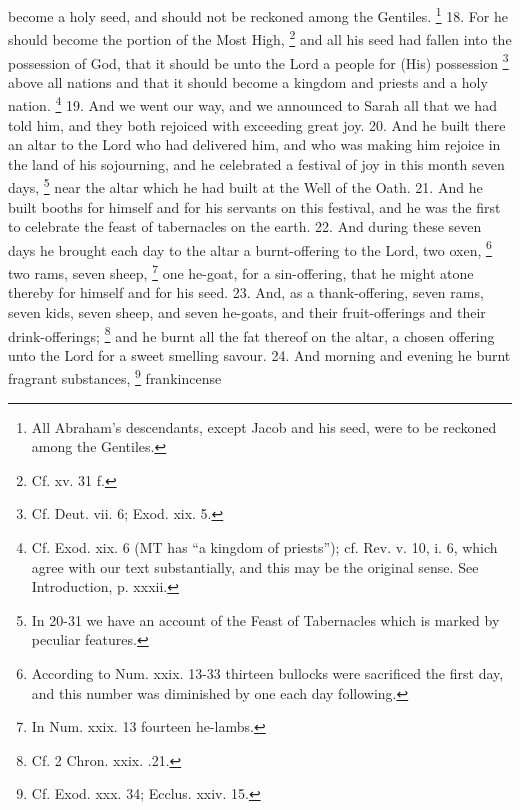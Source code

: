 become a holy seed, and should not be reckoned among the Gentiles. \footnote{All Abraham's descendants, except Jacob and his seed, were to be reckoned among the Gentiles.} 18. For he should become the portion of the Most High, \footnote{Cf. xv. 31 f.} and all his seed had fallen into the possession of God, that it should be unto the Lord a people for (His) possession \footnote{Cf. Deut. vii. 6; Exod. xix. 5.} above all nations and that it should become a kingdom and priests and a holy nation. \footnote{Cf. Exod. xix. 6 (MT has ``a kingdom of priests''); cf. Rev. v. 10, i. 6, which agree with our text substantially, and this may be the original sense. See Introduction, p. xxxii.} 19. And we went our way, and we announced to Sarah all that we had told him, and they both rejoiced with exceeding great joy. 20. And he built there an altar to the Lord who had delivered him, and who was making him rejoice in the land of his sojourning, and he celebrated a festival of joy in this month seven days, \footnote{In 20-31 we have an account of the Feast of Tabernacles which is marked by peculiar features.} near the altar which he had built at the Well of the Oath. 21. And he built booths for himself and for his servants on this festival, and he was the first to celebrate the feast of tabernacles on the earth. 22. And during these seven days he brought each day to the altar a burnt-offering to the Lord, two oxen, \footnote{According to Num. xxix. 13-33 thirteen bullocks were sacrificed the first day, and this number was diminished by one each day following.} two rams, seven sheep, \footnote{In Num. xxix. 13 fourteen he-lambs.} one he-goat, for a sin-offering, that he might atone thereby for himself and for his seed. 23. And, as a thank-offering, seven rams, seven kids, seven sheep, and seven he-goats, and their fruit-offerings and their drink-offerings; \footnote{Cf. 2 Chron. xxix. .21.} and he burnt all the fat thereof on the altar, a chosen offering unto the Lord for a sweet smelling savour. 24. And morning and evening he burnt fragrant substances, \footnote{Cf. Exod. xxx. 34; Ecclus. xxiv. 15.} frankincense

